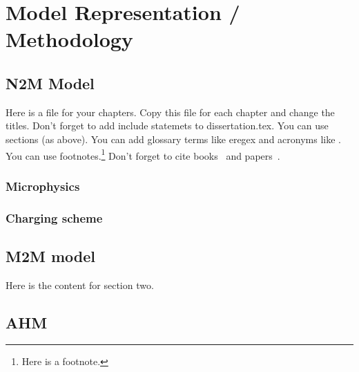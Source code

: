  
\chapter*{Model Representation / Methodology}
\resetfootnote %

\section{N2M Model}

Here is a file for your chapters.  Copy this file for each chapter 
and change the titles.  Don't forget to add include statemets to 
dissertation.tex.  
You can use sections (as above).  
You can add glossary terms like \gls{eregex} and acronyms like .
You can use footnotes.\footnote{Here is a footnote.}
Don't forget to cite books~\cite{Sipser} and papers~\cite{CarleNarendran}.

\subsection{Microphysics}
\subsection{Charging scheme}

\section{M2M model }

Here is the content for section two.

\section{AHM}
